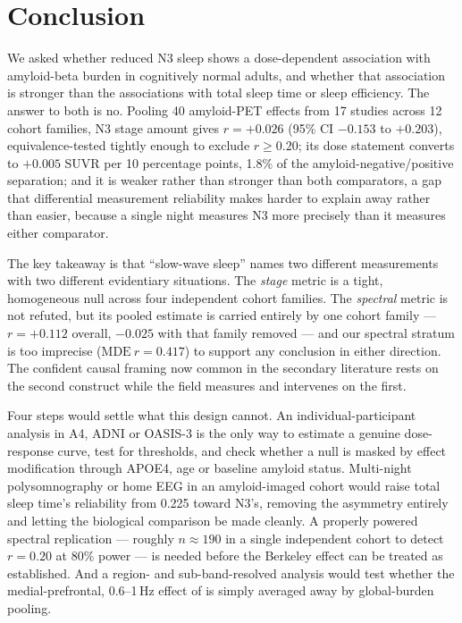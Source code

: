 \section{Conclusion}
\label{sec:conclusion}

We asked whether reduced N3 sleep shows a dose-dependent association with amyloid-beta burden in
cognitively normal adults, and whether that association is stronger than the associations with
total sleep time or sleep efficiency. The answer to both is no. Pooling 40 amyloid-PET effects
from 17 studies across 12 cohort families, N3 stage amount gives $r = +0.026$ (95\% CI $-0.153$
to $+0.203$), equivalence-tested tightly enough to exclude $r \geq 0.20$; its dose statement
converts to $+0.005$ SUVR per 10 percentage points, 1.8\% of the amyloid-negative/positive
separation; and it is weaker rather than stronger than both comparators, a gap that differential
measurement reliability makes harder to explain away rather than easier, because a single night
measures N3 more precisely than it measures either comparator.

The key takeaway is that ``slow-wave sleep'' names two different measurements with two different
evidentiary situations. The \emph{stage} metric is a tight, homogeneous null across four
independent cohort families. The \emph{spectral} metric is not refuted, but its pooled estimate
is carried entirely by one cohort family --- $r = +0.112$ overall, $-0.025$ with that family
removed --- and our spectral stratum is too imprecise ($\mathrm{MDE}\ r = 0.417$) to support any
conclusion in either direction. The confident causal framing now common in the secondary
literature rests on the second construct while the field measures and intervenes on the first.

 Four steps would settle what this design cannot. An individual-participant
analysis in A4, ADNI or OASIS-3 is the only way to estimate a genuine dose-response curve, test
for thresholds, and check whether a null is masked by effect modification through APOE4, age or
baseline amyloid status. Multi-night polysomnography or home EEG in an amyloid-imaged cohort
would raise total sleep time's reliability from 0.225 toward N3's, removing the asymmetry
entirely and letting the biological comparison be made cleanly. A properly powered spectral
replication --- roughly $n \approx 190$ in a single independent cohort to detect $r = 0.20$ at
80\% power --- is needed before the Berkeley effect can be treated as established. And a
region- and sub-band-resolved analysis would test whether the medial-prefrontal, 0.6--1\,Hz
effect of \citet{mander2015} is simply averaged away by global-burden pooling.
